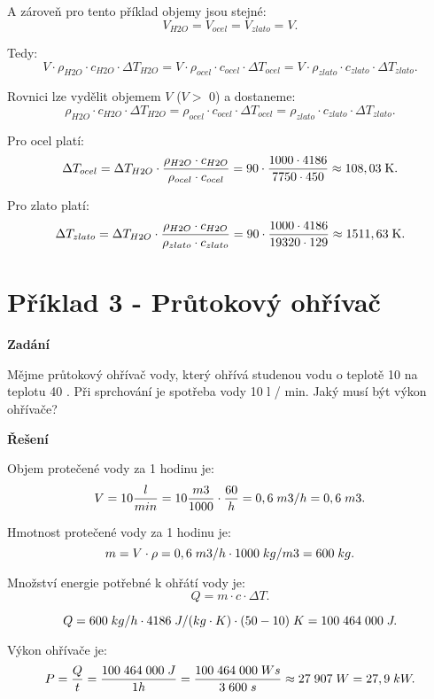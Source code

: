 \documentclass{article}
\begin{document}
A zároveň pro tento příklad objemy jsou stejné:
$$
    V_{H2O} = V_{ocel} = V_{zlato} = V.
$$

Tedy:
$$
    V \cdot \rho_{H2O} \cdot c_{H2O} \cdot \Delta T_{H2O} = V \cdot \rho_{ocel} \cdot c_{ocel} \cdot \Delta T_{ocel} = V \cdot \rho_{zlato} \cdot c_{zlato} \cdot \Delta T_{zlato}.
$$

Rovnici lze vydělit objemem $V$ ($V >$ 0) a dostaneme:
$$
    \rho_{H2O} \cdot c_{H2O} \cdot \Delta T_{H2O} = \rho_{ocel} \cdot c_{ocel} \cdot \Delta T_{ocel} = \rho_{zlato} \cdot c_{zlato} \cdot \Delta T_{zlato}.
$$

Pro ocel platí:
$$
    \Delta T_{ocel} = \Delta T_{H2O} \cdot \frac{\rho_{H2O} \cdot c_{H2O}}{\rho_{ocel} \cdot c_{ocel}} = 90 \cdot \frac{1 000 \cdot 4 186}{7 750 \cdot 450} \approx 108,03 \; \textrm{K}.
$$

Pro zlato platí:
$$
    \Delta T_{zlato} = \Delta T_{H2O} \cdot \frac{\rho_{H2O} \cdot c_{H2O}}{\rho_{zlato} \cdot c_{zlato}} = 90 \cdot \frac{1 000 \cdot 4 186}{19 320 \cdot 129} \approx 1511,63 \; \textrm{K}.
$$



\section*{Příklad 3 - Průtokový ohřívač}

\textbf{Zadání}

Mějme průtokový ohřívač vody, který ohřívá studenou vodu o teplotě 10 \ueqCELS \fs na teplotu 40 \ueqCELS. Při sprchování je spotřeba vody 10 l / min. Jaký musí být výkon ohřívače?

\textbf{Řešení}

Objem protečené vody za 1 hodinu je:
$$
    V = 10 \frac{l}{min} = 10 \frac{m3}{1000} \cdot \frac{60}{h} = 0,6 \; m3/h = 0,6 \; m3.
$$

Hmotnost protečené vody za 1 hodinu je:
$$
    m = V \cdot \rho = 0,6 \; m3/h \cdot 1 000 \; kg/m3 = 600 \; kg.
$$

Množství energie potřebné k ohřátí vody je:
$$
    Q = m \cdot c \cdot \Delta T.
$$

$$
    Q = 600 \; kg/h \cdot 4 186 \; J/ (kg \cdot K) \cdot (50 - 10) \; K = 100 \; 464 \; 000 \; J.
$$

Výkon ohřívače je:
$$
    P = \frac{Q}{t} = \frac{100 \; 464 \; 000 \; J}{1 h} = \frac{100 \; 464 \; 000 \; Ws}{3 \; 600 \; s} \approx 27 \; 907 \; W = 27,9 \; kW.
$$
\end{document}
